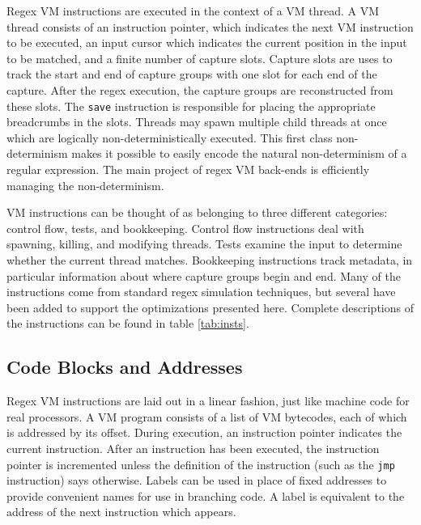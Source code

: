 Regex VM instructions are executed in the context of a VM thread.
A VM thread consists of an instruction pointer, which indicates
the next VM instruction to be executed, an input cursor which
indicates the current position in the input to be matched, and
a finite number of capture slots. Capture slots are uses to
track the start and end of capture groups with one slot for each
end of the capture. After the regex execution, the capture groups
are reconstructed from these slots. The \verb'save' instruction is
responsible for placing the appropriate breadcrumbs in the slots.
Threads may spawn multiple child threads at once which are logically
non-deterministically executed. This first class non-determinism 
makes it possible to easily encode the natural non-determinism of
a regular expression. The main project of regex VM back-ends is
efficiently managing the non-determinism.

VM instructions can be thought of as belonging to three different categories:
control flow, tests, and bookkeeping. Control flow instructions deal with
spawning, killing, and modifying threads. Tests examine the input to determine
whether the current thread matches. Bookkeeping instructions track metadata,
in particular information about where capture groups begin and end.
Many of the instructions come from standard regex simulation
techniques, but several have been added to support the optimizations
presented here. Complete descriptions of the instructions can be found
in table \ref{tab:insts}.

\subsection{Code Blocks and Addresses}

Regex VM instructions are laid out in a linear fashion, just like
machine code for real processors. A VM program consists of a list of
VM bytecodes, each of which is addressed by its offset. During
execution, an instruction pointer indicates the current instruction.
After an instruction has been executed, the instruction pointer
is incremented unless the definition of the instruction (such as
the \verb'jmp' instruction) says otherwise. Labels can be used
in place of fixed addresses to provide convenient names for
use in branching code. A label is equivalent to the address
of the next instruction which appears.

